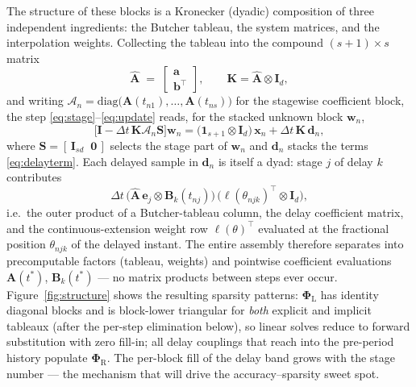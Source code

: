 \documentclass[Afour,sageh,times]{sagej}
\begin{document}
The structure of these blocks is a Kronecker (dyadic) composition of three
independent ingredients: the Butcher tableau, the system matrices, and the
interpolation weights. Collecting the tableau into the compound
$(s{+}1)\times s$ matrix
\begin{equation}
  \hat{\mathbf{A}} \;=\;
  \begin{bmatrix} \mathbf{a} \\ \mathbf{b}^{\!\top} \end{bmatrix},
  \qquad
  \mathbf{K} = \hat{\mathbf{A}}\otimes\mathbf{I}_d,
  \label{eq:compound}
\end{equation}
and writing $\boldsymbol{\mathcal{A}}_n = \mathrm{diag}\bigl(\mathbf{A}(t_{n1}),
\ldots, \mathbf{A}(t_{ns})\bigr)$ for the stagewise coefficient block,
the step \eqref{eq:stage}--\eqref{eq:update} reads, for the stacked unknown
block $\mathbf{w}_n$,
\begin{equation}
  \bigl[\mathbf{I} - \Delta t\,\mathbf{K}
        \boldsymbol{\mathcal{A}}_n\mathbf{S}\bigr]\mathbf{w}_n
  = \bigl(\mathbf{1}_{s+1}\otimes\mathbf{I}_d\bigr)\,\mathbf{x}_n
  + \Delta t\,\mathbf{K}\,\mathbf{d}_n,
  \label{eq:kron}
\end{equation}
where $\mathbf{S} = [\,\mathbf{I}_{sd}\;\;\mathbf{0}\,]$ selects the stage
part of $\mathbf{w}_n$ and $\mathbf{d}_n$ stacks the terms
\eqref{eq:delayterm}. Each delayed sample in $\mathbf{d}_n$ is itself a dyad:
stage $j$ of delay $k$ contributes
\begin{equation}
  \Delta t\,\bigl(\hat{\mathbf{A}}\,\mathbf{e}_j \otimes
  \mathbf{B}_k(t_{nj})\bigr)\,
  \bigl(\boldsymbol{\ell}(\theta_{njk})^{\!\top} \otimes \mathbf{I}_d\bigr),
  \label{eq:dyad}
\end{equation}
i.e.\ the outer product of a Butcher-tableau column, the delay coefficient
matrix, and the continuous-extension weight row $\boldsymbol{\ell}(\theta)^{\!\top}$
evaluated at the fractional position $\theta_{njk}$ of the delayed instant.
The entire assembly therefore separates into precomputable factors
(tableau, weights) and pointwise coefficient evaluations
$\mathbf{A}(t^\ast)$, $\mathbf{B}_k(t^\ast)$ --- no matrix products between
steps ever occur. Figure~\ref{fig:structure} shows the resulting sparsity
patterns: $\mathbf{\Phi}_\mathrm{L}$ has identity diagonal blocks and is
block-lower triangular for \emph{both} explicit and implicit tableaux (after
the per-step elimination below), so linear solves reduce to forward
substitution with zero fill-in; all delay couplings that reach into the
pre-period history populate $\mathbf{\Phi}_\mathrm{R}$. The per-block fill of
the delay band grows with the stage number --- the mechanism that will drive
the accuracy--sparsity sweet spot.
\end{document}
